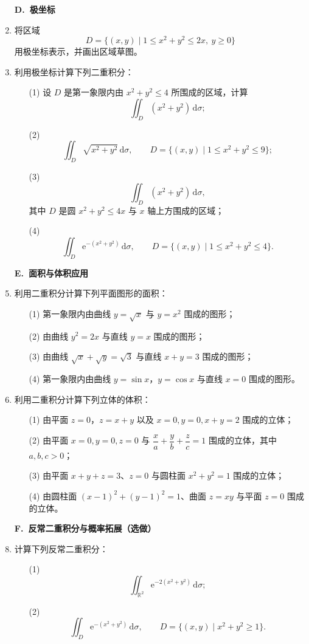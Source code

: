 \documentclass[fontset=fandol]{ctexart}
\newcommand{\dd}{\mathrm{d}}
\newcommand{\ee}{\mathrm{e}}
\newcommand{\RR}{\mathbb{R}}
\begin{document}
\begin{enumerate}
\item[]\textbf{D.\ 极坐标}
\setcounter{enumi}{0}
\item 将区域
\[
D=\{(x,y)\mid1\leq x^2+y^2\leq2x,\ y\geq0\}
\]
用极坐标表示，并画出区域草图。

\item 利用极坐标计算下列二重积分：
\begin{enumerate}
\item[(1)] 设 $D$ 是第一象限内由 $x^2+y^2\leq4$ 所围成的区域，计算
\[
\iint_D(x^2+y^2)\,\dd\sigma;
\]
\item[(2)]
\[
\iint_D\sqrt{x^2+y^2}\,\dd\sigma,
\qquad D=\{(x,y)\mid1\leq x^2+y^2\leq9\};
\]
\item[(3)]
\[
\iint_D(x^2+y^2)\,\dd\sigma,
\]
其中 $D$ 是圆 $x^2+y^2\leq4x$ 与 $x$ 轴上方围成的区域；
\item[(4)]
\[
\iint_D \ee^{-(x^2+y^2)}\,\dd\sigma,
\qquad D=\{(x,y)\mid1\leq x^2+y^2\leq4\}.
\]
\end{enumerate}

\item[]\textbf{E.\ 面积与体积应用}
\setcounter{enumi}{0}
\item 利用二重积分计算下列平面图形的面积：
\begin{enumerate}
\item[(1)] 第一象限内由曲线 $y=\sqrt{x}$ 与 $y=x^2$ 围成的图形；
\item[(2)] 由曲线 $y^2=2x$ 与直线 $y=x$ 围成的图形；
\item[(3)] 由曲线 $\sqrt{x}+\sqrt{y}=\sqrt3$ 与直线 $x+y=3$ 围成的图形；
\item[(4)] 第一象限内由曲线 $y=\sin x$，$y=\cos x$ 与直线 $x=0$ 围成的图形。
\end{enumerate}

\item 利用二重积分计算下列立体的体积：
\begin{enumerate}
\item[(1)] 由平面 $z=0$，$z=x+y$ 以及 $x=0,y=0,x+y=2$ 围成的立体；
\item[(2)] 由平面 $x=0,y=0,z=0$ 与 $\dfrac{x}{a}+\dfrac{y}{b}+\dfrac{z}{c}=1$ 围成的立体，其中 $a,b,c>0$；
\item[(3)] 由平面 $x+y+z=3$、$z=0$ 与圆柱面 $x^2+y^2=1$ 围成的立体；
\item[(4)] 由圆柱面 $(x-1)^2+(y-1)^2=1$、曲面 $z=xy$ 与平面 $z=0$ 围成的立体。
\end{enumerate}

\item[]\textbf{F.\ 反常二重积分与概率拓展（选做）}
\setcounter{enumi}{0}
\item 计算下列反常二重积分：
\begin{enumerate}
\item[(1)]
\[
\iint_{\RR^2}\ee^{-2(x^2+y^2)}\,\dd\sigma;
\]
\item[(2)]
\[
\iint_D \ee^{-(x^2+y^2)}\,\dd\sigma,
\qquad D=\{(x,y)\mid x^2+y^2\geq1\}.
\]
\end{enumerate}


\end{enumerate}
\end{document}

